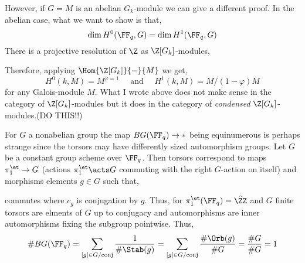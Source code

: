 \documentclass[12pt]{article}
\begin{document}
\begin{rmk}
However, if $G = M$ is an abelian $G_k$-module we can give a different proof. In the abelian case, what we want to show is that,
\[ \dim H^0(\FF_q, G) = \dim H^1(\FF_q, G) \]
There is a projective resolution of $\Z$ as $\Z[G_k]$-modules,
\begin{center}
\end{center}
Therefore, applying $\Hom{\Z[G_k]}{-}{M}$ we get,
\[ H^0(k, M) = M^{\varphi = 1} \quad \text{ and } \quad  H^1(k, M) = M/(1 - \varphi) M \]
for any Galois-module $M$. What I wrote above does not make sense in the category of $\Z[G_k]$-modules but it does in the category of \textit{condensed} $\Z[G_k]$-modules.(DO THIS!!)
\end{rmk}

\begin{example}
For $G$ a nonabelian group the map $B G(\FF_q) \to *$ being equinumerous is perhaps strange since the torsors may have differently sized automorphism groups. Let $G$ be a constant group scheme over $\FF_q$. Then torsors correspond to maps $\pi_1^{\et} \to G$ (actions $\pi_1^{\et} \acts G$ commuting with the right $G$-action on itself) and morphisms elements $g \in G$ such that,
\begin{center}
\end{center}
commutes where $c_g$ is conjugation by $g$. Thus, for $\pi_1^{\et}(\FF_q) = \hat{\ZZ}$ and $G$ finite torsors are elments of $G$ up to conjugacy and automorphisms are inner automorphisms fixing the subgroup pointwise. Thus,
\[ \# BG(\FF_q) = \sum_{[g] \in G / \text{conj}} \frac{1}{\# \Stab(g)} = \sum_{[g] \in G / \text{conj}} \frac{\# \Orb(g)}{\# G} = \frac{\# G}{\# G} = 1 \]
\end{example}
\end{document}
